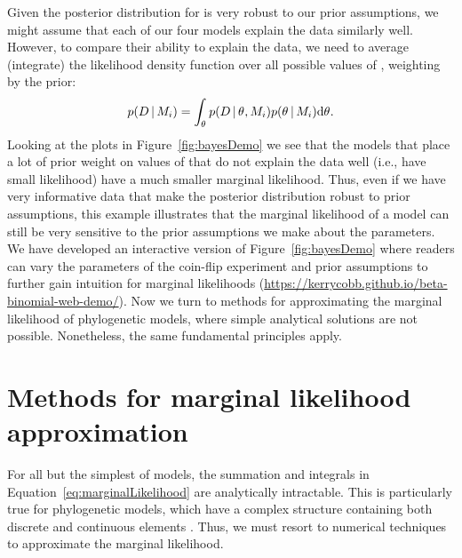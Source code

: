 \begin{linenomath}
Given the posterior distribution for \probheads is very robust to our prior
assumptions, we might assume that each of our four models explain the data
similarly well.
However, to compare their ability to explain the data, we need to
average (integrate) the likelihood density function over all possible
values of \probheads, weighting by the prior:
\begin{equation}
    p(\data \given \model[i]) =
    \int_{\probheads}
    p( \data \given \probheads, \model[i])
    p(\probheads \given \model[i])
    \diff{\probheads}.
    \label{eq:coinMarginalLikelihood}
\end{equation}
Looking at the plots in Figure~\ref{fig:bayesDemo} we see that the models that
place a lot of prior weight on values of \probheads that do not explain the
data well (i.e., have small likelihood) have a much smaller marginal likelihood.
Thus, even if we have very informative data that make the posterior
distribution robust to prior assumptions, this example illustrates that the
marginal likelihood of a model can still be very sensitive to the prior
assumptions we make about the parameters.
We have developed an interactive version of Figure~\ref{fig:bayesDemo} where
readers can vary the parameters of the coin-flip experiment and prior
assumptions to further gain intuition for marginal likelihoods
(\href{https://kerrycobb.github.io/beta-binomial-web-demo/}{https://kerrycobb.github.io/beta-binomial-web-demo/}).
Now we turn to methods for approximating the marginal likelihood of
phylogenetic models, where simple analytical solutions are not possible.
Nonetheless, the same fundamental principles apply.
\end{linenomath}


\section{Methods for marginal likelihood approximation}

For all but the simplest of models, the summation and integrals in
Equation~\ref{eq:marginalLikelihood}
are analytically intractable.
This is particularly true for phylogenetic models, which have a complex
structure containing both discrete and continuous elements \citep{Kim2000}.
Thus, we must resort to numerical techniques to approximate the marginal
likelihood.

